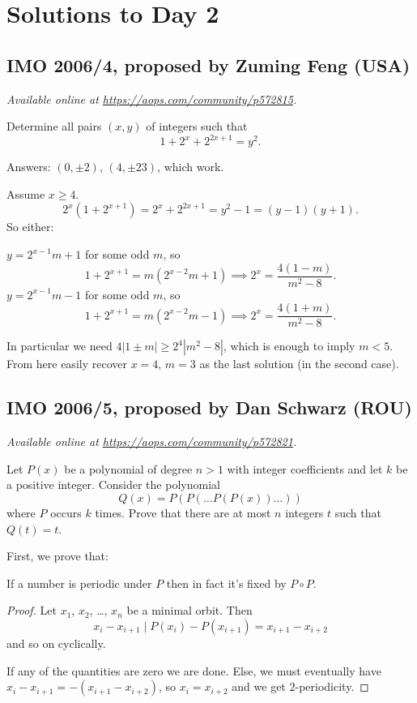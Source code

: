 \documentclass[11pt]{scrartcl}
\begin{document}
\section{Solutions to Day 2}
\subsection{IMO 2006/4, proposed by Zuming Feng (USA)}
\textsl{Available online at \url{https://aops.com/community/p572815}.}
\begin{mdframed}[style=mdpurplebox,frametitle={Problem statement}]
Determine all pairs $(x,y)$ of integers such that
\[ 1 + 2^x + 2^{2x+1} = y^2. \]
\end{mdframed}
Answers: $(0, \pm 2)$, $(4, \pm 23)$, which work.

Assume $x \ge 4$.
\[ 2^x \left( 1 + 2^{x+1} \right)
  = 2^x + 2^{2x+1} = y^2 - 1 = (y-1)(y+1). \]
So either:
\begin{itemize}
  \ii $y = 2^{x-1} m + 1$ for some odd $m$, so
  \[ 1 + 2^{x+1} = m\left( 2^{x-2}m+1 \right)
    \implies 2^x = \frac{4(1-m)}{m^2-8}. \]
  \ii $y = 2^{x-1} m - 1$ for some odd $m$, so
  \[ 1 + 2^{x+1} = m\left( 2^{x-2}m-1 \right)
    \implies 2^x = \frac{4(1+m)}{m^2-8}. \]
\end{itemize}
In particular we need $4|1 \pm m| \ge 2^4 |m^2-8|$,
which is enough to imply $m < 5$.
From here easily recover $x = 4$, $m = 3$ as the last solution
(in the second case).
\pagebreak

\subsection{IMO 2006/5, proposed by Dan Schwarz (ROU)}
\textsl{Available online at \url{https://aops.com/community/p572821}.}
\begin{mdframed}[style=mdpurplebox,frametitle={Problem statement}]
Let $P(x)$ be a polynomial of degree $n > 1$
with integer coefficients and let $k$ be a positive integer.
Consider the polynomial
\[ Q(x) = P(P(\dots P(P(x)) \dots )) \] where $P$ occurs $k$ times.
Prove that there are at most $n$ integers $t$ such that $Q(t) = t$.
\end{mdframed}
First, we prove that:
\begin{claim*}
  [Putnam 2000 et al]
  If a number is periodic under $P$
  then in fact it's fixed by $P \circ P$.
\end{claim*}
\begin{proof}
  Let $x_1$, $x_2$, \dots, $x_n$ be a minimal orbit.
  Then
  \[ x_i - x_{i+1} \mid P(x_i) - P(x_{i+1})
    = x_{i+1} - x_{i+2} \]
  and so on cyclically.

  If any of the quantities are zero we are done.
  Else, we must eventually have $x_i - x_{i+1} = -(x_{i+1} - x_{i+2})$,
  so $x_i = x_{i+2}$ and we get $2$-periodicity.
\end{proof}
\end{document}
